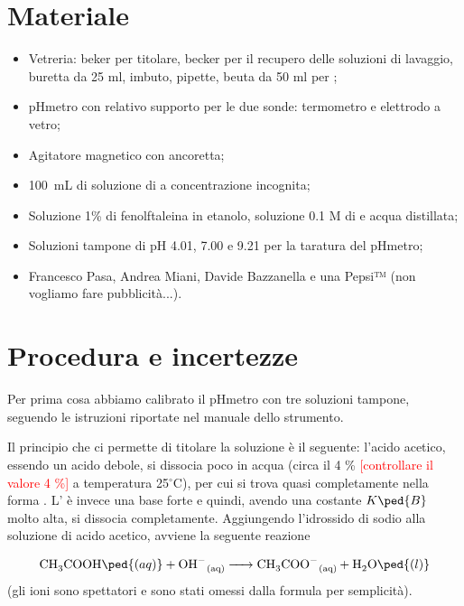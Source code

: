 \section*{Materiale}

\begin{itemize}
        \setlength{\parskip}{0pt}
        \item{Vetreria: beker per titolare, becker per il recupero delle soluzioni di lavaggio,
            buretta da 25 ml, imbuto, pipette, beuta da 50 ml per ;}
        \item{pHmetro con relativo supporto per le due sonde: termometro e elettrodo a vetro;}
        \item{Agitatore magnetico con ancoretta;}
        \item{\SI{100}{\milli\liter} di soluzione di  a concentrazione incognita;}
        \item{Soluzione 1\% di fenolftaleina in etanolo, soluzione 0.1 M di  e acqua distillata;}
        \item{Soluzioni tampone di pH 4.01, 7.00 e 9.21 per la taratura del pHmetro;}
        \item{Francesco Pasa, Andrea Miani, Davide Bazzanella e una Pepsi™ (non vogliamo fare pubblicità...).}
\end{itemize}

\section*{Procedura e incertezze}

Per prima cosa abbiamo calibrato il pHmetro con tre soluzioni tampone,
seguendo le istruzioni riportate nel manuale dello strumento.

Il principio che ci permette di titolare la soluzione è il seguente: l'acido acetico, essendo un acido debole,
si dissocia poco in acqua (circa il 4 \% \textcolor{red}{[controllare il valore 4 \%]} a temperatura 25$^\circ$C),
per cui si trova quasi completamente nella forma .
L' è invece una base forte e quindi, avendo una costante $K\ped{B}$ molto alta,
si dissocia completamente. Aggiungendo l'idrossido di sodio alla soluzione di acido acetico,
avviene la seguente reazione

\begin{equation}
    \ce{CH3COOH\ped{(aq)} + OH- _{(aq)} -> CH3COO- _{(aq)} + H2O\ped{(l)}}
    \label{eq:reaz}
\end{equation}
%
(gli ioni  sono spettatori e sono stati omessi dalla formula per semplicità).

